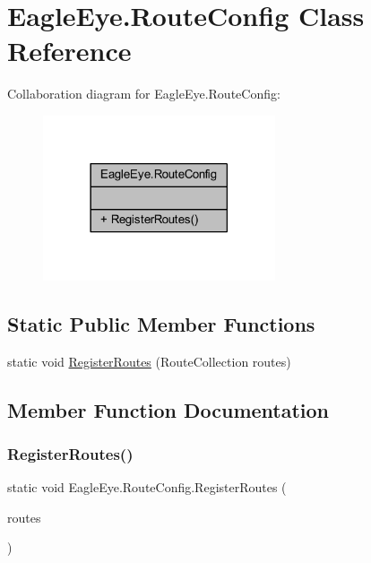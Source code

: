 \hypertarget{class_eagle_eye_1_1_route_config}{}\section{Eagle\+Eye.\+Route\+Config Class Reference}
\label{class_eagle_eye_1_1_route_config}


Collaboration diagram for Eagle\+Eye.\+Route\+Config\+:\nopagebreak
\begin{figure}[H]
\begin{center}
\leavevmode
\includegraphics[width=194pt]{class_eagle_eye_1_1_route_config__coll__graph}
\end{center}
\end{figure}
\subsection*{Static Public Member Functions}
\begin{DoxyCompactItemize}
\item 
static void \mbox{\hyperlink{class_eagle_eye_1_1_route_config_a7db021b23f5a50303ade8309b5a63afb}{Register\+Routes}} (Route\+Collection routes)
\end{DoxyCompactItemize}


\subsection{Member Function Documentation}
\mbox{\label{class_eagle_eye_1_1_route_config_a7db021b23f5a50303ade8309b5a63afb}} 
\subsubsection{\texorpdfstring{RegisterRoutes()}{RegisterRoutes()}}
{\footnotesize\ttfamily static void Eagle\+Eye.\+Route\+Config.\+Register\+Routes (\begin{DoxyParamCaption}\item[{Route\+Collection}]{routes }\end{DoxyParamCaption})\hspace{0.3cm}{\ttfamily [static]}}

